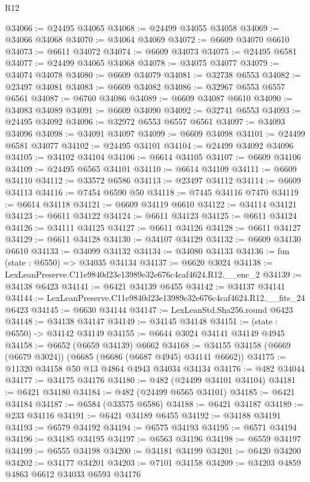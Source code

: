 \begin{lexlean}{R12}
\begin{coremodule}
@34066 := @24495 @34065
@34068 := @24499 @34055 @34058
@34069 := @34066 @34068
@34070 := @34064 @34069
@34072 := @6609 @34070 @6610
@34073 := @6611 @34072
@34074 := @6609 @34073
@34075 := @24495 @6581
@34077 := @24499 @34065 @34068
@34078 := @34075 @34077
@34079 := @34074 @34078
@34080 := @6609 @34079
@34081 := @32738 @6553
@34082 := @23497 @34081
@34083 := @6609 @34082
@34086 := @32967 @6553 @6557 @6561
@34087 := @6760 @34086
@34089 := @6609 @34087 @6610
@34090 := @34083 @34089
@34091 := @6609 @34090
@34092 := @32741 @6553
@34093 := @24495 @34092
@34096 := @32972 @6553 @6557 @6561
@34097 := @34093 @34096
@34098 := @34091 @34097
@34099 := @6609 @34098
@34101 := @24499 @6581 @34077
@34102 := @24495 @34101
@34104 := @24499 @34092 @34096
@34105 := @34102 @34104
@34106 := @6614 @34105
@34107 := @6609 @34106
@34109 := @24495 @6565 @34101
@34110 := @6614 @34109
@34111 := @6609 @34110
@34112 := @33572 @6586
@34113 := @23497 @34112
@34114 := @6609 @34113
@34116 := @7454 @6590 @50
@34118 := @7445 @34116 @7470
@34119 := @6614 @34118
@34121 := @6609 @34119 @6610
@34122 := @34114 @34121
@34123 := @6611 @34122
@34124 := @6611 @34123
@34125 := @6611 @34124
@34126 := @34111 @34125
@34127 := @6611 @34126
@34128 := @6611 @34127
@34129 := @6611 @34128
@34130 := @34107 @34129
@34132 := @6609 @34130 @6610
@34133 := @34099 @34132
@34134 := @34080 @34133
@34136 := fun (state : @6550) => @34035 @34134
@34137 := @6620 @3024
@34138 := LexLeanPreserve.C11e9840d23e13989e32e676c4caf4624.R12.__enc_2
@34139 := @34138 @6423
@34141 := @6421 @34139 @6455
@34142 := @34137 @34141
@34144 := LexLeanPreserve.C11e9840d23e13989e32e676c4caf4624.R12.__fits_24 @6423
@34145 := @6630 @34144
@34147 := LexLeanStd.Sha256.round @6423
@34148 := @34138 @34147
@34149 := @34145 @34148
@34151 := (state : @6550) -> @34142 @34149
@34155 := @6644 @3024 @34141 @34149 @4945
@34158 := @6652 (@6659 @34139) @6662
@34168 := @34155 @34158 (@6669 (@6679 @3024)) (@6685 (@6686 (@6687 @4945) @34141 @6662))
@34175 := @11320 @34158 @50 @13 @4864 @4943 @34034 @34134
@34176 := @482 @34044
@34177 := @34175 @34176
@34180 := @482 (@24499 @34101 @34104)
@34181 := @6421 @34180
@34184 := @482 (@24499 @6565 @34101)
@34185 := @6421 @34184
@34187 := @6584 (@33575 @6586)
@34188 := @6421 @34187
@34189 := @233 @34116
@34191 := @6421 @34189 @6455
@34192 := @34188 @34191
@34193 := @6579 @34192
@34194 := @6575 @34193
@34195 := @6571 @34194
@34196 := @34185 @34195
@34197 := @6563 @34196
@34198 := @6559 @34197
@34199 := @6555 @34198
@34200 := @34181 @34199
@34201 := @6420 @34200
@34202 := @34177 @34201
@34203 := @7101 @34158
@34209 := @34203 @4859 @4863 @6612 @34033 @6593 @34176

\end{coremodule}
\end{lexlean}
